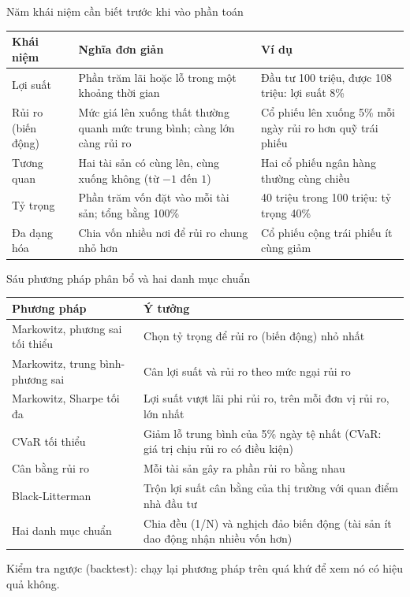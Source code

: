 \documentclass[aspectratio=169,10pt]{beamer}
\let\small\normalsize
\begin{document}
\begin{frame}[t]{Năm khái niệm cần biết trước khi vào phần toán}
  \centering
  \begin{tabular}{@{}L{2.6cm}L{5.6cm}L{4.6cm}@{}}
    \toprule
    \textbf{Khái niệm} & \textbf{Nghĩa đơn giản} & \textbf{Ví dụ} \\
    \midrule
    Lợi suất & Phần trăm lãi hoặc lỗ trong một khoảng thời gian & Đầu tư 100 triệu, được 108 triệu: lợi suất 8\% \\
    Rủi ro (biến động) & Mức giá lên xuống thất thường quanh mức trung bình; càng lớn càng rủi ro & Cổ phiếu lên xuống 5\% mỗi ngày rủi ro hơn quỹ trái phiếu \\
    Tương quan & Hai tài sản có cùng lên, cùng xuống không (từ \(-1\) đến \(1\)) & Hai cổ phiếu ngân hàng thường cùng chiều \\
    Tỷ trọng & Phần trăm vốn đặt vào mỗi tài sản; tổng bằng 100\% & 40 triệu trong 100 triệu: tỷ trọng 40\% \\
    Đa dạng hóa & Chia vốn nhiều nơi để rủi ro chung nhỏ hơn & Cổ phiếu cộng trái phiếu ít cùng giảm \\
    \bottomrule
  \end{tabular}
\end{frame}

\begin{frame}[t]{Sáu phương pháp phân bổ và hai danh mục chuẩn}
  \centering\small
  \begin{tabular}{@{}L{4.0cm}L{8.6cm}@{}}
    \toprule
    \textbf{Phương pháp} & \textbf{Ý tưởng} \\
    \midrule
    Markowitz, phương sai tối thiểu \cite{markowitz} & Chọn tỷ trọng để rủi ro (biến động) nhỏ nhất \\
    Markowitz, trung bình-phương sai & Cân lợi suất và rủi ro theo mức ngại rủi ro \\
    Markowitz, Sharpe tối đa & Lợi suất vượt lãi phi rủi ro, trên mỗi đơn vị rủi ro, lớn nhất \\
    CVaR tối thiểu & Giảm lỗ trung bình của 5\% ngày tệ nhất (CVaR: giá trị chịu rủi ro có điều kiện) \\
    Cân bằng rủi ro & Mỗi tài sản gây ra phần rủi ro bằng nhau \\
    Black-Litterman & Trộn lợi suất cân bằng của thị trường với quan điểm nhà đầu tư \\
    \midrule
    Hai danh mục chuẩn & Chia đều (1/N) và nghịch đảo biến động (tài sản ít dao động nhận nhiều vốn hơn) \\
    \bottomrule
  \end{tabular}

  Kiểm tra ngược (backtest): chạy lại phương pháp trên quá khứ để xem nó có hiệu quả không.
\end{frame}
\end{document}
